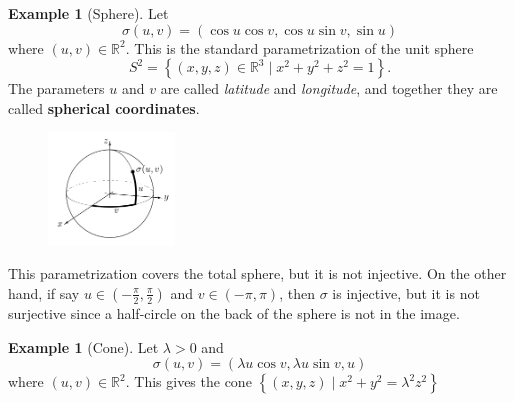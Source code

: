\documentclass[reqno]{amsart}
\theoremstyle{plain}%
\theoremstyle{definition}
\newtheorem{example}[theorem]{Example}
\theoremstyle{remark}
\begin{document}
\begin{example}[Sphere]
    Let
    \[
    \sigma (u,v) = \left( \cos u \cos v, \cos u \sin v, \sin u \right) 
    \] 
    where $\left( u,v \right) \in \mathbb{R}^2$. This is the standard
    parametrization of the unit sphere
    \[
    S^2 = \left\{ \left( x,y,z \right) \in \mathbb{R}^3  \mid 
    x^2 + y^2 + z^2 = 1 \right\} .
    \] 
    The parameters $u$ and $v$ are called \textit{latitude} and
    \textit{longitude}, and together they are called \textbf{spherical
    coordinates}.
    \begin{figure}[H]
        \centering
        \includegraphics[width=0.3\textwidth]{spherical-coordinates.png}
        \label{fig:spherical-coordinates-png}
    \end{figure}
    This parametrization covers the total sphere, but it is not injective. On
    the other hand, if say $u \in \left( -\frac{\pi}{2},\frac{\pi}{2} \right)
    $ and $v \in \left( -\pi, \pi \right) $, then $\sigma$ is injective, but it
    is not surjective since a half-circle on the back of the sphere is not in
    the image.
\end{example}
\begin{example}[Cone]
    Let $\lambda  > 0$ and
    \[
    \sigma \left( u,v \right) = \left( \lambda  u \cos v,
    \lambda  u \sin v , u\right) 
    \] 
    where $\left( u,v  \right) \in \mathbb{R}^2$. This gives the cone
    $\left\{ \left( x,y,z \right)  \mid x^2 + y^2 = \lambda^2 z^2 \right\} $
\end{example}
\end{document}
